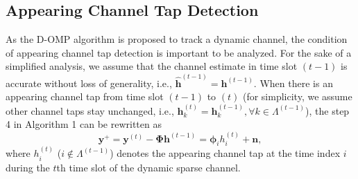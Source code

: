 \documentclass[conference]{IEEEtran}
\begin{document}
\subsection{Appearing Channel Tap Detection}
As the D-OMP algorithm is proposed to track a dynamic channel, the condition of appearing channel tap detection is important to be analyzed.
For the sake of a simplified analysis, we assume that the channel estimate in time slot $(t-1)$ is accurate without loss of generality, i.e., $\mathbf{\hat{h}}^{(t-1)}=\mathbf{h}^{(t-1)}$.
When there is an appearing channel tap from time slot $(t-1)$ to $(t)$ (for simplicity, we assume other channel taps stay unchanged, i.e., $\mathbf{h}_k^{(t)}=\mathbf{h}_k^{(t-1)}, \forall k\in\Lambda^{(t-1)}$), the step 4 in Algorithm 1 can be rewritten as
\begin{equation}
\mathbf{y}^{+}=\mathbf{y}^{(t)}-\mathbf{\Phi}\mathbf{h}^{(t-1)}=\boldsymbol{\phi}_{i}h_i^{(t)}+\mathbf{n},%
\end{equation}
where $h_i^{(t)}$ ($i\notin\Lambda^{(t-1)}$) denotes the appearing channel tap at the time index $i$ during the $t$th time slot of the dynamic sparse channel.
\end{document}
